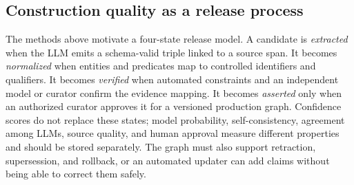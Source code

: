 \subsection{Construction quality as a release process}

The methods above motivate a four-state release model. A candidate is \emph{extracted} when the LLM emits a schema-valid triple linked to a source span. It becomes \emph{normalized} when entities and predicates map to controlled identifiers and qualifiers. It becomes \emph{verified} when automated constraints and an independent model or curator confirm the evidence mapping. It becomes \emph{asserted} only when an authorized curator approves it for a versioned production graph. Confidence scores do not replace these states; model probability, self-consistency, agreement among LLMs, source quality, and human approval measure different properties and should be stored separately. The graph must also support retraction, supersession, and rollback, or an automated updater can add claims without being able to correct them safely.

